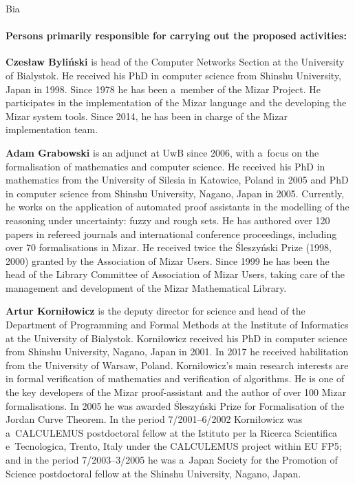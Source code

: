 \begin{sitedescription}{Bia}
\paragraph*{Persons primarily responsible for carrying out the proposed activities:}

\begin{compactitem}

\item\textbf{Czesław Byliński} is head of the Computer Networks Section at the University of Bialystok.
He received his PhD in computer science from Shinshu University, Japan in 1998.
Since 1978 he has been a~member of the Mizar Project.
He participates in the implementation of the Mizar language and the developing the Mizar system tools. 
Since 2014, he has been in charge of the Mizar implementation team.

\item\textbf{Adam Grabowski} is an adjunct at UwB since 2006, 
with a~focus on the formalisation of mathematics and computer science.
He received his PhD in mathematics from the University of Silesia in Katowice, Poland in 2005 
and PhD in computer science from Shinshu University, Nagano, Japan in 2005.
Currently, he works on the application of automated proof assistants
in the modelling of the reasoning under uncertainty: fuzzy and rough sets.
He has authored over 120 papers in refereed journals and international conference
proceedings, including over 70 formalisations in Mizar.
He received twice the Śleszyński Prize (1998, 2000) granted by the Association of Mizar Users.
Since 1999 he has been the head of the Library Committee of Association of Mizar Users, taking care of
the management and development of the Mizar Mathematical Library.

\item\textbf{Artur Korniłowicz} is the deputy director for science 
and head of the Department of Programming and Formal Methods
at the Institute of Informatics at the University of Bialystok.
Korniłowicz received his PhD in computer science from Shinshu University, Nagano, Japan in 2001.
In 2017 he received habilitation from the University of Warsaw, Poland.
Korniłowicz's main research interests are in formal verification of mathematics and verification of algorithms.
He is one of the key developers of the Mizar proof-assistant and the author of over 100 Mizar formalisations.
In 2005 he was awarded Śleszyński Prize for Formalisation of the Jordan Curve Theorem.
In the period 7/2001--6/2002 Korniłowicz was a~CALCULEMUS postdoctoral fellow
at the Istituto per la Ricerca Scientifica e~Tecnologica, Trento, Italy under the CALCULEMUS project within EU FP5;
and in the period 7/2003--3/2005 he was a~Japan Society for the Promotion of Science 
postdoctoral fellow at the Shinshu University, Nagano, Japan.


\end{compactitem}
\end{sitedescription}
